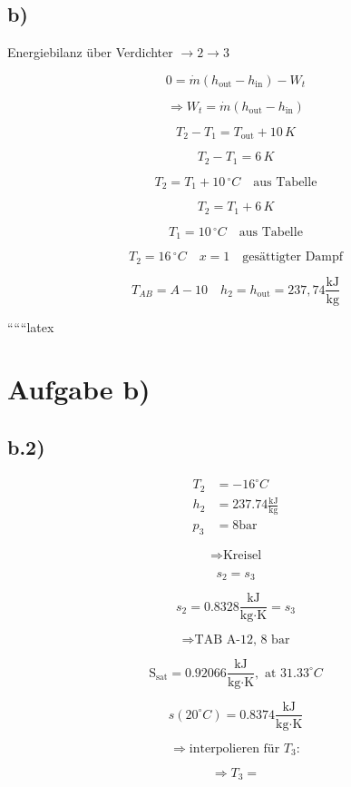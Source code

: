 

\subsection*{b)}

Energiebilanz über Verdichter $\rightarrow 2 \rightarrow 3$

\[
0 = \dot{m} \left( h_{\text{out}} - h_{\text{in}} \right) - W_t
\]

\[
\Rightarrow W_t = \dot{m} \left( h_{\text{out}} - h_{\text{in}} \right)
\]

\[
T_2 - T_1 = T_{\text{out}} + 10\,K
\]

\[
T_2 - T_1 = 6\,K
\]

\[
T_2 = T_1 + 10\,^\circ C \quad \text{aus Tabelle}
\]

\[
T_2 = T_1 + 6\,K
\]

\[
T_1 = 10\,^\circ C \quad \text{aus Tabelle}
\]

\[
T_2 = 16\,^\circ C \quad x = 1 \quad \text{gesättigter Dampf}
\]

\[
T_{AB} = A - 10 \quad h_2 = h_{\text{out}} = 237,74 \frac{\text{kJ}}{\text{kg}}
\]

``````latex

\section*{Aufgabe b)}

\subsection*{b.2)}
\begin{align*}
    T_2 &= -16^\circ C \\
    h_2 &= 237.74 \frac{\text{kJ}}{\text{kg}} \\
    p_3 &= 8 \text{bar}
\end{align*}

\[
\Rightarrow \text{Kreisel}
\]

\[
s_2 = s_3
\]

\[
s_2 = 0.8328 \frac{\text{kJ}}{\text{kg} \cdot \text{K}} = s_3
\]

\[
\Rightarrow \text{TAB A-12, 8 bar}
\]

\[
\text{S}_{\text{sat}} = 0.92066 \frac{\text{kJ}}{\text{kg} \cdot \text{K}}, \text{ at } 31.33^\circ C
\]

\[
s(20^\circ C) = 0.8374 \frac{\text{kJ}}{\text{kg} \cdot \text{K}}
\]

\[
\Rightarrow \text{interpolieren für } T_3:
\]

\[
\Rightarrow T_3 =
\]